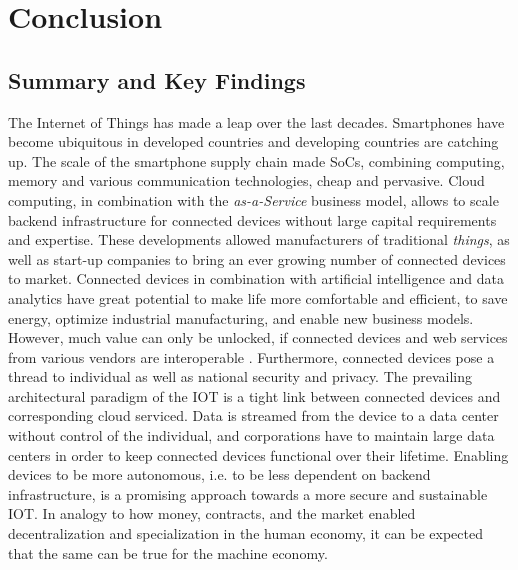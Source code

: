 \chapter{Conclusion}
\label{sec:discussion}

\section{Summary and Key Findings}

The Internet of Things has made a leap over the last decades. Smartphones have become ubiquitous in developed countries and developing countries are catching up. The scale of the smartphone supply chain made \ac{SoC}s, combining computing, memory and various communication technologies, cheap and pervasive. Cloud computing, in combination with the \emph{as-a-Service} business model, allows to scale backend infrastructure for connected devices without large capital requirements and expertise. These developments allowed manufacturers of traditional \emph{things}, as well as start-up companies to bring an ever growing number of connected devices to market. Connected devices in combination with artificial intelligence and data analytics have great potential to make life more comfortable and efficient, to save energy, optimize industrial manufacturing, and enable new business models. However, much value can only be unlocked, if connected devices and web services from various vendors are interoperable \parencite{manyika2015unlocking}. Furthermore, connected devices pose a thread to individual as well as national security and privacy. 
The prevailing architectural paradigm of the \ac{IOT} is a tight link between connected devices and corresponding cloud serviced. Data is streamed from the device to a data center without control of the individual, and corporations have to maintain large data centers in order to keep connected devices functional over their lifetime. 
Enabling devices to be more autonomous, i.e. to be less dependent on backend infrastructure, is a promising approach towards a more secure and sustainable \ac{IOT}. In analogy to how money, contracts, and the market enabled decentralization and specialization in the human economy, it can be expected that the same can be true for the machine economy. 

